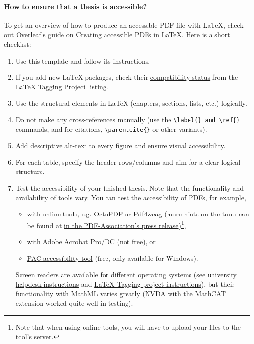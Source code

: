 \documentclass[english, manual, a4paper]{csthesis}
\begin{document}
\paragraph{How to ensure that a thesis is accessible?}

To get an overview of how to produce an accessible PDF file with \LaTeX,
check out Overleaf's guide on \href{https://docs.overleaf.com/writing-and-editing/creating-accessible-pdfs}{Creating accessible PDFs in LaTeX}. Here is a short checklist:

\begin{enumerate}
    \item Use this template and follow its instructions.
    \item If you add new \LaTeX{} packages, check their \href{https://latex3.github.io/tagging-project/tagging-status/}{compatibility status} from the \LaTeX{} Tagging Project listing.
    \item Use the structural elements in \LaTeX{} (chapters, sections, lists, etc.) logically.
    \item Do not make any cross-references manually (use the \texttt{\textbackslash label\{\} and \texttt{\textbackslash ref\{\}}} commands, and for citations, \texttt{\textbackslash parentcite\{\}} or other  variants).
    \item Add descriptive alt-text to every figure and ensure visual accessibility.
    \item For each table, specify the header rows/columns and aim for a clear logical structure.
\item Test the accessibility of your finished thesis. Note that the functionality and availability of tools vary. You can test the accessibility of PDFs, for example,
\begin{itemize}
\item with online tools, e.g. \href{https://octopdf.com}{OctoPDF} or \href{https://pdf4wcag.com}{Pdf4wcag} (more hints on the tools can be found at \href{https://pdfa.org/accessible-math-in-pdf-finally/}{in the PDF-Association's press release})\footnote{Note that when using online tools, you will have to upload your files to the tool's server.},
\item with Adobe Acrobat Pro/DC (not free), or
\item \href{https://pac.pdf-accessibility.org/en}{PAC accessibility tool} (free, only available for Windows).
\end{itemize}
Screen readers are available for different operating systems (see \href{https://helpdesk.it.helsinki.fi/help/20057}{university helpdesk instructions} and \href{https://latex3.github.io/tagging-project/documentation/wtpdf/fulldoc}{LaTeX Tagging project instructions}), but their functionality with MathML varies greatly (NVDA with the MathCAT extension worked quite well in testing). 
\end{enumerate}

\printbibliography[heading=bibintoc,title=\mybibname]%
\label{last_bib_page}
\end{document}

